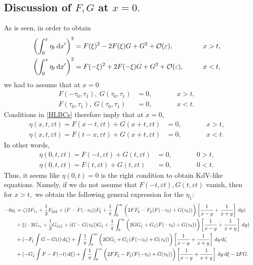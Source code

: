 \documentclass[10pt,reqno,oneside,a4paper, landscape]{article}
\begin{document}
\subsection{Discussion of $F, G$ at $x = 0.$}
As is seen, in order to obtain 
\begin{align*}
\left( \int^{x}_{0} \eta_t \,\mathrm{d} x' \right)^2 &= F(\xi)^2 - 2F(\xi)G + G^2 + \mathcal{O}(\varepsilon), &&\qquad x > t, \\
\left( \int^{x}_{0} \eta_t \,\mathrm{d} x' \right)^2 &= F(-\xi)^2 + 2F(-\xi)G + G^2 + \mathcal{O}(\varepsilon), &&\qquad x < t,
\end{align*}
we had to assume that at $x = 0$
\begin{equation}\label{HLBCs}
\begin{aligned}
F(-\tau_0, \tau_1), ~ G(\tau_0, \tau_1) &= 0, &&\qquad x > t, \\
F(\tau_0, \tau_1), ~ G(\tau_0, \tau_1) &= 0, &&\qquad x < t.
\end{aligned}
\end{equation}
Conditions in \eqref{HLBCs} therefore imply that at $x=0,$
\begin{equation*}
\begin{aligned}
\eta(x, t, \varepsilon t) = F(x-t, \varepsilon t)+ G(x+t, \varepsilon t) &= 0, &&\qquad x > t, \\
\eta(x, t, \varepsilon t) = F(t-x, \varepsilon t) + G(x+t, \varepsilon t) &= 0, &&\qquad x < t.
\end{aligned}
\end{equation*}
In other words, 
\begin{align}
\eta(0, t, \varepsilon t) = F(-t, \varepsilon t)+ G(t, \varepsilon t) &= 0, &&\qquad 0 > t, \label{x>t}\\
\eta(0, t, \varepsilon t) = F(t, \varepsilon t) + G(t, \varepsilon t) &= 0, &&\qquad 0 < t. \label{x<t}
\end{align}
Thus, it seems like $\eta(0,t) = 0$ is the right condition to obtain KdV-like equations. Namely, if we do not assume that $F(-t, \varepsilon t), G(t, \varepsilon t)$ vanish, then for $x>t,$ we obtain the following general expression for the $\eta_1:$
\begin{equation}
\begin{aligned}
- 4\eta_{1} &=  \zeta(2F_{\tau_1} + \frac{1}{3}F_{\xi\xi\xi} + (F- F(-\tau_0))F_\xi +  \frac{1}{\pi} \int_0^\infty \bigg(2FF_\xi -F_\xi(F(-\tau_0)+G(\tau_0))\bigg)  \left[ \frac{1}{x-y} + \frac{1}{x+y} \right] \,\mathrm{d} y) \\
&+ \xi(- 2G_{\tau_1} +  \frac{1}{3} G_{\zeta\zeta\zeta}+ (G - G(\tau_0))G_\zeta + \frac{1}{\pi} \int_0^\infty \bigg( 2GG_\zeta + G_\zeta(F(-\tau_0)+G(\tau_0)) \bigg) \left[ \frac{1}{x-y} + \frac{1}{x+y} \right] \,\mathrm{d} y) \\
&+ (- F_{\xi} \int G -G(t) \,\mathrm{d} \zeta) + \int \frac{1}{\pi} \int_0^\infty \bigg( 2GG_\zeta + G_\zeta(F(-\tau_0)+G(\tau_0)) \bigg) \left[ \frac{1}{x-y} + \frac{1}{x+y} \right] \,\mathrm{d} y \,\mathrm{d} \zeta \\
&+ (-G_{\zeta} \int F - F(-t) \,\mathrm{d} \xi ) +  \int \frac{1}{\pi} \int_0^\infty \bigg(2FF_\xi -F_\xi(F(-\tau_0)+G(\tau_0))\bigg) \left[ \frac{1}{x-y} + \frac{1}{x+y} \right] \,\mathrm{d} y \,\mathrm{d} \xi  - 2 FG.
\end{aligned}
\end{equation}
\end{document}

